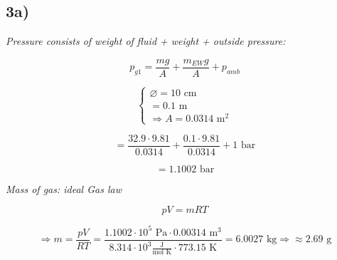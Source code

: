 

\subsection*{3a)}

\textit{Pressure consists of weight of fluid + weight + outside pressure:}

\[
p_{g1} = \frac{mg}{A} + \frac{m_{EW}g}{A} + p_{amb}
\]

\[
\begin{cases}
\varnothing = 10 \text{ cm} \\
= 0.1 \text{ m} \\
\Rightarrow A = 0.0314 \text{ m}^2
\end{cases}
\]

\[
= \frac{32.9 \cdot 9.81}{0.0314} + \frac{0.1 \cdot 9.81}{0.0314} + 1 \text{ bar}
\]

\[
= 1.1002 \text{ bar}
\]

\textit{Mass of gas: ideal Gas law}

\[
pV = mRT
\]

\[
\Rightarrow m = \frac{pV}{RT} = \frac{1.1002 \cdot 10^5 \text{ Pa} \cdot 0.00314 \text{ m}^3}{8.314 \cdot 10^3 \frac{\text{J}}{\text{mol K}} \cdot 773.15 \text{ K}} = 6.0027 \text{ kg} \Rightarrow \approx 2.69 \text{ g}
\]